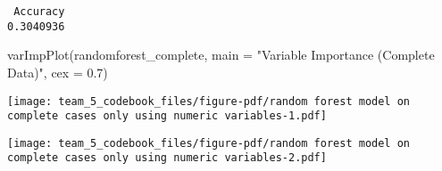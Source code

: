 \documentclass[
  letterpaper,
  DIV=11,
  numbers=noendperiod]{scrartcl}
\newenvironment{Shaded}{\begin{snugshade}}{\end{snugshade}}
\newcommand{\AttributeTok}[1]{\textcolor[rgb]{0.40,0.45,0.13}{#1}}
\newcommand{\CommentTok}[1]{\textcolor[rgb]{0.37,0.37,0.37}{#1}}
\newcommand{\DecValTok}[1]{\textcolor[rgb]{0.68,0.00,0.00}{#1}}
\newcommand{\FloatTok}[1]{\textcolor[rgb]{0.68,0.00,0.00}{#1}}
\newcommand{\FunctionTok}[1]{\textcolor[rgb]{0.28,0.35,0.67}{#1}}
\newcommand{\NormalTok}[1]{\textcolor[rgb]{0.00,0.23,0.31}{#1}}
\newcommand{\OtherTok}[1]{\textcolor[rgb]{0.00,0.23,0.31}{#1}}
\newcommand{\SpecialCharTok}[1]{\textcolor[rgb]{0.37,0.37,0.37}{#1}}
\newcommand{\StringTok}[1]{\textcolor[rgb]{0.13,0.47,0.30}{#1}}
\begin{document}
\begin{verbatim}
 Accuracy 
0.3040936 
\end{verbatim}

\begin{Shaded}
\begin{Highlighting}[]
\FunctionTok{varImpPlot}\NormalTok{(randomforest\_complete, }\AttributeTok{main =} \StringTok{"Variable Importance (Complete Data)"}\NormalTok{, }\AttributeTok{cex =} \FloatTok{0.7}\NormalTok{)}
\end{Highlighting}
\end{Shaded}

\begin{center}
\texttt{[image: team\_5\_codebook\_files/figure-pdf/random forest model on complete cases only using numeric variables-1.pdf]}
\end{center}

\begin{Shaded}
\end{Shaded}

\begin{center}
\texttt{[image: team\_5\_codebook\_files/figure-pdf/random forest model on complete cases only using numeric variables-2.pdf]}
\end{center}
\end{document}
